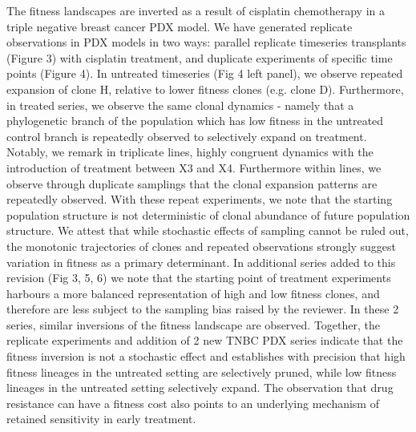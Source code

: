 The fitness landscapes are inverted as a result of cisplatin chemotherapy in a triple negative breast cancer PDX model.  We have generated replicate observations in PDX models in two ways: parallel replicate timeseries transplants (Figure 3) with cisplatin treatment, and duplicate experiments of specific time points (Figure 4). In untreated timeseries (Fig 4 left panel), we observe repeated expansion of clone H, relative to lower fitness clones (e.g. clone D). Furthermore, in treated series, we observe the same clonal dynamics - namely that a phylogenetic branch of the population which has low fitness in the untreated control branch is repeatedly observed to selectively expand on treatment.  Notably, we remark in triplicate lines,  highly congruent dynamics with the introduction of treatment between X3 and X4.  Furthermore within lines, we observe through duplicate samplings that the clonal expansion patterns are repeatedly observed. With these repeat experiments, we note that the starting population structure is not deterministic of clonal abundance of future population structure.  We attest that while stochastic effects of sampling cannot be ruled out, the monotonic trajectories of clones and repeated observations strongly suggest variation in fitness as a primary determinant. In additional series added to this revision (Fig 3, 5, 6) we note that the starting point of treatment experiments harbours a more balanced representation of high and low fitness clones, and therefore are less subject to the sampling bias raised by the reviewer.  In these 2 series, similar inversions of the fitness landscape are observed.  Together, the replicate experiments and addition of 2 new TNBC PDX series indicate that the fitness inversion is not a stochastic effect and establishes with precision that high fitness lineages in the untreated setting are selectively pruned, while low fitness lineages in the untreated setting selectively expand. The observation that drug resistance can have a fitness cost also points to an underlying mechanism of retained sensitivity in early treatment.




